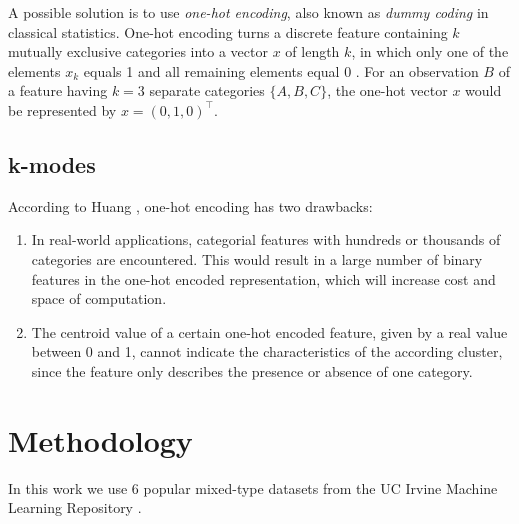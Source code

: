 A possible solution is to use \textit{one-hot encoding}, also known as \textit{dummy coding} in classical statistics. One-hot encoding turns a discrete feature containing $k$ mutually exclusive categories into a vector $x$ of length $k$, in which only one of the elements $x_k$ equals 1 and all remaining elements equal 0 \cite{bishop_2006}. For an observation $B$ of a feature having $k=3$ separate categories $\{A, B, C\}$, the one-hot vector $x$ would be represented by $x = (0, 1, 0)^{\intercal}$.

\subsection{k-modes}

According to Huang \cite{kmodes}, one-hot encoding has two drawbacks:

\begin{enumerate} 
	\item In real-world applications, categorial features with hundreds or thousands of categories are encountered. This would result in a large number of binary features in the one-hot encoded representation, which will increase cost and space of computation.
	\item The centroid value of a certain one-hot encoded feature, given by a real value between 0 and 1, cannot indicate the characteristics of the according cluster, since the feature only describes the presence or absence of one category.
\end{enumerate}





\section{Methodology}

In this work we use 6 popular mixed-type datasets from the UC Irvine Machine Learning Repository \cite{uci_ml_rpo}.




